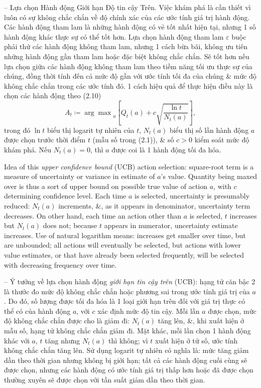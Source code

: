 \documentclass{article}
\begin{document}
\begin{itemize}
\begin{itemize}
        -- {\sf Lựa chọn Hành động Giới hạn Độ tin cậy Trên.} Việc khám phá là cần thiết vì luôn có sự không chắc chắn về độ chính xác của các ước tính giá trị hành động. Các hành động tham lam là những hành động có vẻ tốt nhất hiện tại, nhưng 1 số hành động khác thực sự có thể tốt hơn. Lựa chọn hành động tham lam $\varepsilon$ buộc phải thử các hành động không tham lam, nhưng 1 cách bừa bãi, không ưu tiên những hành động gần tham lam hoặc đặc biệt không chắc chắn. Sẽ tốt hơn nếu lựa chọn giữa các hành động không tham lam theo tiềm năng tối ưu thực sự của chúng, đồng thời tính đến cả mức độ gần với ước tính tối đa của chúng \& mức độ không chắc chắn trong các ước tính đó. 1 cách hiệu quả để thực hiện điều này là chọn các hành động theo (2.10)
        \begin{equation*}
            A_t\coloneqq{\arg\max}_a\left[Q_t(a) + c\sqrt{\frac{\ln t}{N_t(a)}}\right],
        \end{equation*}
        trong đó $\ln t$ biểu thị logarit tự nhiên của $t$, $N_t(a)$ biểu thị số lần hành động $a$ được chọn trước thời điểm $t$ (mẫu số trong (2.1)), \& số $c > 0$ kiểm soát mức độ khám phá. Nếu $N_t(a) = 0$, thì $a$ được coi là 1 hành động tối đa hóa.

        Idea of this {\it upper confidence bound} (UCB) action selection: square-root term is a measure of uncertainty or variance in estimate of $a$'s value. Quantity being maxed over is thus a sort of upper bound on possible true value of action $a$, with $c$ determining confidence level. Each time $a$ is selected, uncertainty is presumably reduced: $N_t(a)$ increments, \&, as it appears in denominator, uncertainty term decreases. On other hand, each time an action other than $a$ is selected, $t$ increases but $N_t(a)$ does not; because $t$ appears in numerator, uncertainty estimate increases. Use of natural logarithm means: increases get smaller over time, but are unbounded; all actions will eventually be selected, but actions with lower value estimates, or that have already been selected frequently, will be selected with decreasing frequency over time.

        -- Ý tưởng về lựa chọn hành động {\it giới hạn tin cậy trên} (UCB): hạng tử căn bậc 2 là thước đo mức độ không chắc chắn hoặc phương sai trong ước tính giá trị của $a$. Do đó, số lượng được tối đa hóa là 1 loại giới hạn trên đối với giá trị thực có thể có của hành động $a$, với $c$ xác định mức độ tin cậy. Mỗi lần $a$ được chọn, mức độ không chắc chắn được cho là giảm đi: $N_t(a)$ tăng lên, \&, khi xuất hiện ở mẫu số, hạng tử không chắc chắn giảm đi. Mặt khác, mỗi lần chọn 1 hành động khác với $a$, $t$ tăng nhưng $N_t(a)$ thì không; vì $t$ xuất hiện ở tử số, ước tính không chắc chắn tăng lên. Sử dụng logarit tự nhiên có nghĩa là: mức tăng giảm dần theo thời gian nhưng không bị giới hạn; tất cả các hành động cuối cùng sẽ được chọn, nhưng các hành động có ước tính giá trị thấp hơn hoặc đã được chọn thường xuyên sẽ được chọn với tần suất giảm dần theo thời gian.


\end{itemize}
\end{itemize}
\end{document}
